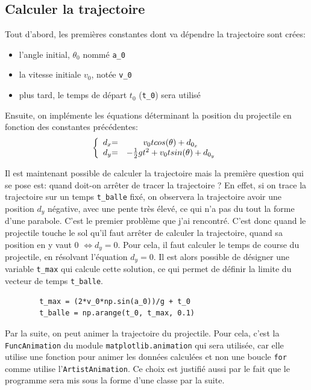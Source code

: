 \documentclass[a4paper,11pt]{article}
\begin{document}
\subsection{Calculer la trajectoire}
Tout d'abord, les premières constantes dont va dépendre la trajectoire sont crées:
\begin{itemize}
	\item l'angle initial, $\theta_0$ nommé \verb|a_0|
	\item la vitesse initiale $v_0$, notée \verb|v_0|
	\item plus tard, le temps de départ $t_0$ (\verb|t_0|) sera utilisé
\end{itemize}
Ensuite, on implémente les équations déterminant la position du projectile en fonction des constantes précédentes:
\[ \left \{
\begin{array}{c @{= \quad} c}
	d_x & v_0 t cos (\theta) + d_{0_x}\\
	d_y &- \frac{1}{2} g t^2 + v_0 t sin(\theta) + d_{0_y}
\end{array}
\right. \]

Il est maintenant possible de calculer la trajectoire mais la première question qui se pose est: quand doit-on arrêter de tracer la trajectoire ? En effet, si on trace la trajectoire sur un temps \verb|t_balle| fixé, on observera la trajectoire avoir une position $d_y$ négative, avec une pente très élevé, ce qui n'a pas du tout la forme d'une parabole. C'est le premier problème que j'ai rencontré. C'est donc quand le projectile touche le sol qu'il faut arrêter de calculer la trajectoire, quand sa position en y vaut 0 $\Leftrightarrow d_y = 0$. Pour cela, il faut calculer le temps de course du projectile, en résolvant l'équation $d_y = 0$. Il est alors possible de désigner une variable \verb|t_max| qui calcule cette solution, ce qui permet de définir la limite du vecteur de temps \verb|t_balle|.
	\begin{verbatim}
		t_max = (2*v_0*np.sin(a_0))/g + t_0     
		t_balle = np.arange(t_0, t_max, 0.1)
	\end{verbatim}
	
Par la suite, on peut animer la trajectoire du projectile. Pour cela, c'est la \verb|FuncAnimation| du module \verb|matplotlib.animation| qui sera utilisée, car elle utilise une fonction pour animer les données calculées et non une boucle \verb|for| comme utilise l'\verb|ArtistAnimation|. Ce choix est justifié aussi par le fait que le programme sera mis sous la forme d'une classe par la suite. 
\end{document}
